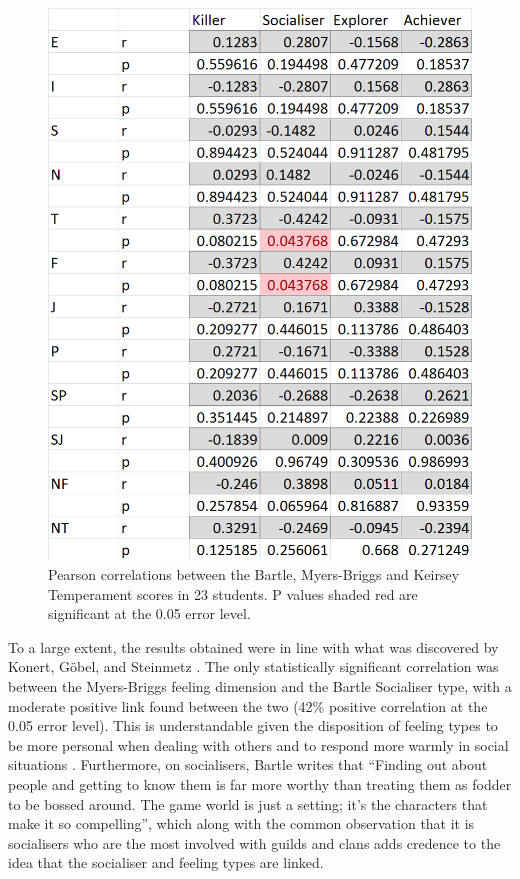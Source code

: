 \documentclass[12pt,a4paper,twoside]{report}
\begin{document}
\begin{figure}
	\begin{center}
		\includegraphics[width=1\textwidth]{../img/results.png}
		\caption{Pearson correlations between the Bartle, Myers-Briggs and Keirsey Temperament scores in 23 students. P values shaded red are significant at the 0.05 error level.}
		\label{results}
	\end{center}
\end{figure}

To a large extent, the results obtained were in line with what was discovered by Konert, G{\"o}bel, and Steinmetz \cite{konertmodeling}. The only statistically significant correlation was between the Myers-Briggs feeling dimension and the Bartle Socialiser type, with a moderate positive link found between the two (42\% positive correlation at the 0.05 error level). This is understandable given the disposition of feeling types to be more personal when dealing with others and to respond more warmly in social situations \cite{keirsey1984}. Furthermore, on socialisers, Bartle writes that ``Finding out about people and getting to know them is far more worthy than treating them as fodder to be bossed around. The game world is just a setting; it's the characters that make it so compelling''\cite{bartle1996hearts}, which along with the common observation that it is socialisers who are the most involved with guilds and clans adds credence to the idea that the socialiser and feeling types are linked. 
\end{document}
